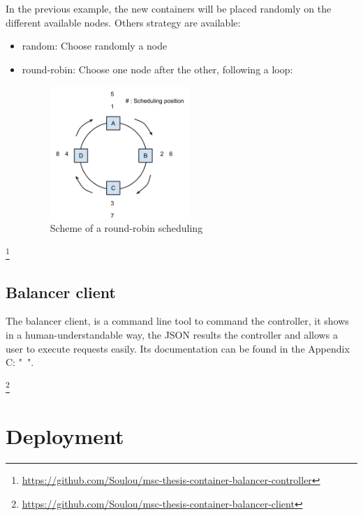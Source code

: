In the previous example, the new containers will be placed randomly on the different
available nodes. Others strategy are available:

\begin{itemize}
\item{random: Choose randomly a node}
\item{round-robin: Choose one node after the other, following a loop:
\begin{figure}[h!]
\begin{center}
\includegraphics[width=0.5\textwidth]{./Images/round-robin.png}
\caption{Scheme of a round-robin scheduling}
\end{center}
\end{figure}}
\end{itemize}
 
\footnote{\url{https://github.com/Soulou/msc-thesis-container-balancer-controller}}

\subsection{Balancer client}

The balancer client, is a command line tool to command the controller, it
shows in a human-understandable way, the JSON results the controller and allows
a user to execute requests easily. Its documentation can be found in the
Appendix C: "~".

\footnote{\url{https://github.com/Soulou/msc-thesis-container-balancer-client}}

\section{Deployment}

